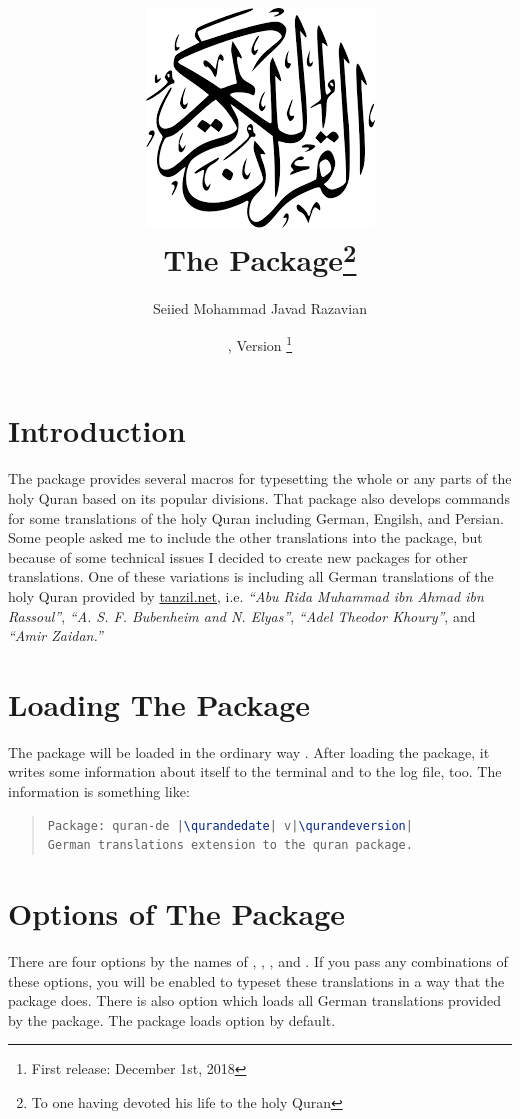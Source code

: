 \documentclass[a4paper]{ltxdoc}
\title{\includegraphics[scale=.3]{quran.png}\\
The \xpackage{quran-de} Package\footnote{To one having devoted his life to the holy Quran}\\
}
\author{Seiied Mohammad Javad Razavian\\\xemail{javadr@gmail.com}}
\date{\qurandedate,  Version \qurandeversion\footnote{First release: December 1st, 2018}}
\begin{document}
\maketitle

\tableofcontents

\section{Introduction}
The  package provides several macros for
typesetting the whole or any parts of the holy Quran based on its popular divisions. That package also develops 
commands for some translations of the holy Quran including German, Engilsh, and Persian. 
Some people asked me to include the other translations into the  package, 
but because of some technical issues I decided to create new packages for other translations. 
One of these variations is  including all German translations of the holy Quran 
provided by \url{tanzil.net}, i.e. \emph{``Abu Rida Muhammad ibn Ahmad ibn Rassoul''},
\emph{``A. S. F. Bubenheim and N. Elyas''}, \emph{``Adel Theodor Khoury''}, 
and \emph{``Amir Zaidan.''}


\section{Loading The Package}
The package will be loaded in the ordinary way
.
After loading the package, it writes some information about itself to the
terminal and to the log file, too. The information is something like:

\begin{quote}
\begin{lstlisting}[style=BashInputStyle, language=tex, escapechar={|}]
Package: quran-de |\qurandedate| v|\qurandeversion| 
German translations extension to the quran package.
\end{lstlisting}
\end{quote}


\section{Options of The Package}\label{sec:qurantypesetting}
There are four options by the names of , , , 
and .
If you pass any combinations of these options, you will be enabled to typeset these translations in a way 
that the  package does. 
There is also  option which loads all German translations provided by the  package.
The package loads  option by default.
\end{document}
